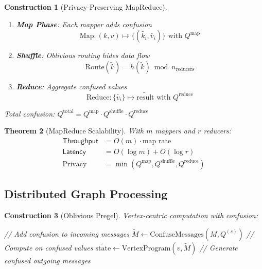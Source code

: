 \documentclass[11pt,final]{article}
\newcommand{\observed}[1]{\tilde{#1}}
\newcommand{\Throughput}{\mathsf{Throughput}}
\newcommand{\Latency}{\mathsf{Latency}}
\newtheorem{theorem}{Theorem}[section]
\newtheorem{construction}[theorem]{Construction}
\begin{document}
\begin{construction}[Privacy-Preserving MapReduce]
\begin{enumerate}
    \item \textbf{Map Phase}: Each mapper adds confusion
        \begin{equation}
        \text{Map}: (k, v) \mapsto \{(\observed{k_i}, \observed{v_i})\} \text{ with } Q^{\text{map}}
        \end{equation}
    
    \item \textbf{Shuffle}: Oblivious routing hides data flow
        \begin{equation}
        \text{Route}(\observed{k}) = h(\observed{k}) \bmod n_{\text{reducers}}
        \end{equation}
    
    \item \textbf{Reduce}: Aggregate confused values
        \begin{equation}
        \text{Reduce}: \{\observed{v_i}\} \mapsto \observed{\text{result}} \text{ with } Q^{\text{reduce}}
        \end{equation}
\end{enumerate}
Total confusion: $Q^{\text{total}} = Q^{\text{map}} \cdot Q^{\text{shuffle}} \cdot Q^{\text{reduce}}$
\end{construction}

\begin{theorem}[MapReduce Scalability]
With $m$ mappers and $r$ reducers:
\begin{align}
\Throughput &= O(m) \cdot \text{map rate} \\
\Latency &= O(\log m) + O(\log r) \\
\text{Privacy} &= \min(Q^{\text{map}}, Q^{\text{shuffle}}, Q^{\text{reduce}})
\end{align}
\end{theorem}

\subsection{Distributed Graph Processing}

\begin{construction}[Oblivious Pregel]
Vertex-centric computation with confusion:
\begin{algorithm}[H]
\caption{Oblivious Vertex Program}
// Add confusion to incoming messages\;
$\observed{M} \gets \text{ConfuseMessages}(M, Q^{(s)})$\;
// Compute on confused values\;
$\observed{\text{state}} \gets \text{VertexProgram}(v, \observed{M})$\;
// Generate confused outgoing messages\;
\end{algorithm}
\end{construction}
\end{document}
